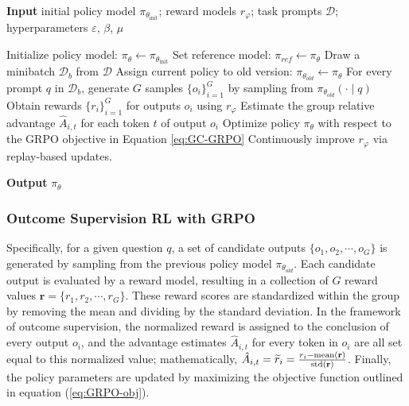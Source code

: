 \begin{itemize}[topsep=0pt]
\begin{algorithm}[t]
  \small
  \caption{Iterative Group Relative Policy Optimization}
  \textbf{Input} initial policy model $\pi_{\theta_{\text{init}}}$; reward models $r_\varphi$; task prompts $\mathcal{D}$; 
  hyperparameters $\varepsilon$, $\beta$, $\mu$
  \begin{algorithmic}[1]
    \State Initialize policy model: $\pi_\theta \leftarrow \pi_{\theta_{\text{init}}}$
      \State Set reference model: $\pi_{ref} \leftarrow \pi_\theta$
        \State Draw a minibatch $\mathcal{D}_b$ from $\mathcal{D}$
        \State Assign current policy to old version: $\pi_{\theta_{old}} \leftarrow \pi_\theta$
        \State For every prompt $q$ in $\mathcal{D}_b$, generate $G$ samples $\{o_i\}_{i=1}^G$ by sampling from $\pi_{\theta_{old}} (\cdot \mid q)$
        \State Obtain rewards $\{r_i\}_{i=1}^{G}$ for outputs $o_i$ using $r_\varphi$
        \State Estimate the group relative advantage $\hat{A}_{i,t}$ for each token $t$ of output $o_i$
          \State Optimize policy $\pi_\theta$ with respect to the GRPO objective in Equation \ref{eq:GC-GRPO}
        \EndFor
      \EndFor 
      \State Continuously improve $r_\varphi$ via replay-based updates.
    \EndFor 
  \end{algorithmic}
  \textbf{Output} $\pi_\theta$
  \label{alg:iter-grpo}
\end{algorithm}

\subsubsection{Outcome Supervision RL with GRPO} Specifically, for a given question $q$, a set of candidate outputs $\{o_1, o_2, \cdots, o_G\}$ is generated by sampling from the previous policy model $\pi_{\theta_{old}}$. Each candidate output is evaluated by a reward model, resulting in a collection of $G$ reward values $\mathbf{r} = \{r_1, r_2, \cdots, r_G\}$. These reward scores are standardized within the group by removing the mean and dividing by the standard deviation. In the framework of outcome supervision, the normalized reward is assigned to the conclusion of every output $o_i$, and the advantage estimates $\hat{A}_{i, t}$ for every token in $o_i$ are all set equal to this normalized value; mathematically, $\hat{A}_{i, t} = \widetilde{r}_i = \frac{r_i- {\rm mean}(\mathbf{r})}{{\rm std}(\mathbf{r})}$. Finally, the policy parameters are updated by maximizing the objective function outlined in equation (\ref{eq:GRPO-obj}).


\end{itemize}

